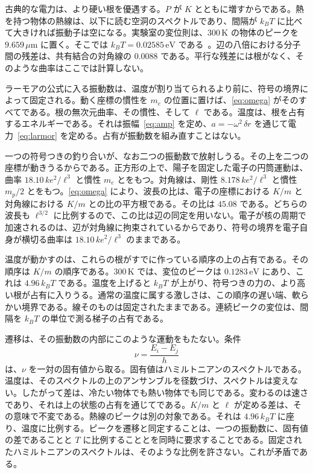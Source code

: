 \documentclass[a4paper]{article}
\begin{document}
古典的な電力は、より硬い根を優遇する。\(P\) が \(K\) とともに増すからである。熱を持つ物体の熱線は、以下に読む空洞のスペクトルであり、間隔が \(k_B T\) に比べて大きければ振動子は空になる。実験室の変位則は、\(300\,\mathrm{K}\) の物体のピークを \(9.659\,\mu\mathrm{m}\) に置く。そこでは \(k_B T=0.02585\,\mathrm{eV}\) である~\cite{codata2018}。辺の八倍における分子間の残差は、共有結合の対角線の \(0.0088\) である。平行な残差には根がなく、そのような曲率はここでは計算しない。

ラーモアの公式に入る振動数は、温度が割り当てられるより前に、符号の境界によって固定される。動く座標の慣性を \(m_e\) の位置に置けば、\eqref{eq:omega} がそのすべてである。根の無次元曲率、その慣性、そして \(\ell\) である。温度は、根を占有するエネルギーである。それは振幅~\eqref{eq:amp} を定め、\(a=-\omega^{2}\,\delta r\) を通じて電力~\eqref{eq:larmor} を定める。占有が振動数を組み直すことはない。

一つの符号つきの釣り合いが、なお二つの振動数で放射しうる。その上を二つの座標が動きうるからである。正方形の上で、陽子を固定した電子の円筒運動は、曲率 \(18.10\,k e^{2}/\ell^{3}\) と慣性 \(m_e\) とをもつ。対角線は、剛性 \(8.178\,k e^{2}/\ell^{3}\) と慣性 \(m_p/2\) とをもつ。\eqref{eq:omega} により、波長の比は、電子の座標における \(K/m\) と対角線における \(K/m\) との比の平方根である。その比は \(45.08\) である。どちらの波長も \(\ell^{3/2}\) に比例するので、この比は辺の同定を用いない。電子が核の周期で加速されるのは、辺が対角線に拘束されているからであり、符号の境界を電子自身が横切る曲率は \(18.10\,k e^{2}/\ell^{3}\) のままである。

温度が動かすのは、これらの根がすでに作っている順序の上の占有である。その順序は \(K/m\) の順序である。\(300\,\mathrm{K}\) では、変位のピークは \(0.1283\,\mathrm{eV}\) にあり、これは \(4.96\,k_B T\) である。温度を上げると \(k_B T\) が上がり、符号つきの力の、より高い根が占有に入りうる。通常の温度に属する激しさは、この順序の遅い端、軟らかい境界である。線そのものは固定されたままである。連続ピークの変位は、間隔を \(k_B T\) の単位で測る梯子の占有である。

遷移は、その振動数の内部にこのような運動をもたない。条件
\begin{equation}
\label{eq:bohrnu}
\nu=\frac{E_i-E_j}{h}
\end{equation}
は、\(\nu\) を一対の固有値から取る。固有値はハミルトニアンのスペクトルである。温度は、そのスペクトルの上のアンサンブルを径数づけ、スペクトルは変えない。したがって差は、冷たい物体でも熱い物体でも同じである。変わるのは速さであり、それは上の状態の占有を通じてである。\(K/m\) と \(\ell\) が定める差は、その意味で不変である。熱線のピークは別の対象である。それは \(4.96\,k_B T\) に座り、温度に比例する。ピークを遷移と同定することは、一つの振動数に、固有値の差であることと \(T\) に比例することとを同時に要求することである。固定されたハミルトニアンのスペクトルは、そのような比例を許さない。これが矛盾である。
\end{document}

